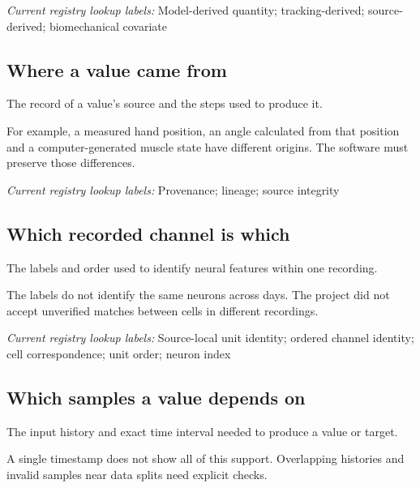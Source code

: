 \noindent\textit{Current registry lookup labels:} Model-derived quantity; tracking-derived; source-derived; biomechanical covariate\par

\begin{samepage}
\subsection*{Where a value came from}
\noindent The record of a value’s source and the steps used to produce it.\par
\end{samepage}
\begin{samepage}
\noindent For example, a measured hand position, an angle calculated from that position and a computer-generated muscle state have different origins. The software must preserve those differences.\par\nopagebreak[4]

\end{samepage}


\noindent\textit{Current registry lookup labels:} Provenance; lineage; source integrity\par

\begin{samepage}
\subsection*{Which recorded channel is which}
\noindent The labels and order used to identify neural features within one recording.\par
\end{samepage}
\begin{samepage}
\noindent The labels do not identify the same neurons across days. The project did not accept unverified matches between cells in different recordings.\par\nopagebreak[4]

\end{samepage}


\noindent\textit{Current registry lookup labels:} Source-local unit identity; ordered channel identity; cell correspondence; unit order; neuron index\par

\begin{samepage}
\subsection*{Which samples a value depends on}
\noindent The input history and exact time interval needed to produce a value or target.\par
\end{samepage}
\begin{samepage}
\noindent A single timestamp does not show all of this support. Overlapping histories and invalid samples near data splits need explicit checks.\par\nopagebreak[4]

\end{samepage}

